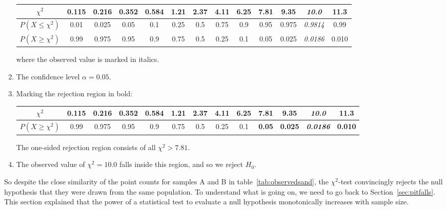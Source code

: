 \begin{enumerate}
  \begin{center}
    \begin{tabular}{c|c@{\gap}c@{\gap}c@{\gap}c@{\gap}
        c@{\gap}c@{\gap}c@{\gap}c@{\gap}c@{\gap}c@{\gap}c@{\gap}c}
      $\chi^2$ & 0.115 & 0.216 & 0.352 & 0.584 & 1.21 & 2.37 &
      4.11 & 6.25 & 7.81 & 9.35 & \textit{10.0} & 11.3 \\ \hline
      $P(X\leq{\chi^2})$ & 0.01 & 0.025 & 0.05 & 0.1 & 0.25 &
      0.5 & 0.75 & 0.9 & 0.95 & 0.975 & \textit{0.9814} & 0.99 \\
      $P(X\geq{\chi^2})$ & 0.99 & 0.975 & 0.95 & 0.9 & 0.75 & 0.5 &
      0.25 & 0.1 & 0.05 & 0.025 & \textit{0.0186} & 0.010
    \end{tabular}
  \end{center}

  \noindent where the observed value is marked in italics.
  
\item The confidence level $\alpha = 0.05$.

\item Marking the rejection region in bold:
  
  \begin{center}
    \begin{tabular}{c|c@{\gap}c@{\gap}c@{\gap}c@{\gap}
        c@{\gap}c@{\gap}c@{\gap}c@{\gap}c@{\gap}c@{\gap}c@{\gap}c}
      $\chi^2$ & 0.115 & 0.216 & 0.352 & 0.584 & 1.21 & 2.37 &
      4.11 & 6.25 & \textbf{7.81} & \textbf{9.35} &
      \textbf{\textit{10.0}} & \textbf{11.3} \\ \hline
      $P(X\geq{\chi^2})$ & 0.99 & 0.975 & 0.95 & 0.9 & 0.75 & 0.5 &
      0.25 & 0.1 & \textbf{0.05} & \textbf{0.025} &
      \textbf{\textit{0.0186}} & \textbf{0.010}
    \end{tabular}
  \end{center}

  The one-sided rejection region consists of all $\chi^2>{7.81}$.

\item The observed value of $\chi^2=10.0$ falls inside this region,
  and so we reject $H_0$.

\end{enumerate}

So despite the close similarity of the point counts for samples A and
B in table~\ref{tab:observedsand}, the $\chi^2$-test convincingly
rejects the null hypothesis that they were drawn from the same
population. To understand what is going on, we need to go back to
Section~\ref{sec:pitfalls}. This section explained that the power of a
statistical test to evaluate a null hypothesis monotonically increases
with sample size.\medskip

